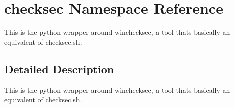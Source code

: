 \hypertarget{namespacechecksec}{}\section{checksec Namespace Reference}
\label{namespacechecksec}


This is the python wrapper around winchecksec, a tool that\textquotesingle{}s basically an equivalent of checksec.\+sh.  




\subsection{Detailed Description}
This is the python wrapper around winchecksec, a tool that\textquotesingle{}s basically an equivalent of checksec.\+sh. 